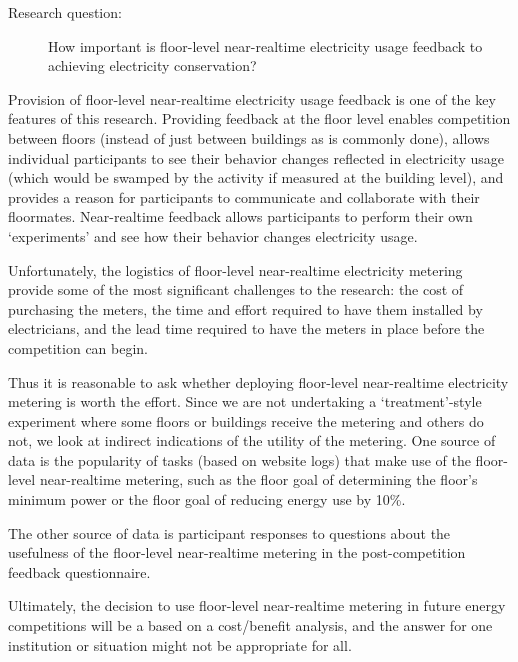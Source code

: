 \begin{description}
\item[Research question:] How important is floor-level near-realtime electricity usage feedback to achieving electricity conservation?
\end{description}

Provision of floor-level near-realtime electricity usage feedback is one of the key features of this research. Providing feedback at the floor level enables competition between floors (instead of just between buildings as is commonly done), allows individual participants to see their behavior changes reflected in electricity usage (which would be swamped by the activity if measured at the building level), and provides a reason for participants to communicate and collaborate with their floormates. Near-realtime feedback allows participants to perform their own `experiments' and see how their behavior changes electricity usage.

Unfortunately, the logistics of floor-level near-realtime electricity metering provide some of the most significant challenges to the research: the cost of purchasing the meters, the time and effort required to have them installed by electricians, and the lead time required to have the meters in place before the competition can begin.

Thus it is reasonable to ask whether deploying floor-level near-realtime electricity metering is worth the effort. Since we are not undertaking a `treatment'-style experiment where some floors or buildings receive the metering and others do not, we look at indirect indications of the utility of the metering. One source of data is the popularity of tasks (based on website logs) that make use of the floor-level near-realtime metering, such as the floor goal of determining the floor's minimum power or the floor goal of reducing energy use by 10\%.

The other source of data is participant responses to questions about the usefulness of the floor-level near-realtime metering in the post-competition feedback questionnaire.

Ultimately, the decision to use floor-level near-realtime metering in future energy competitions will be a based on a cost/benefit analysis, and the answer for one institution or situation might not be appropriate for all.
